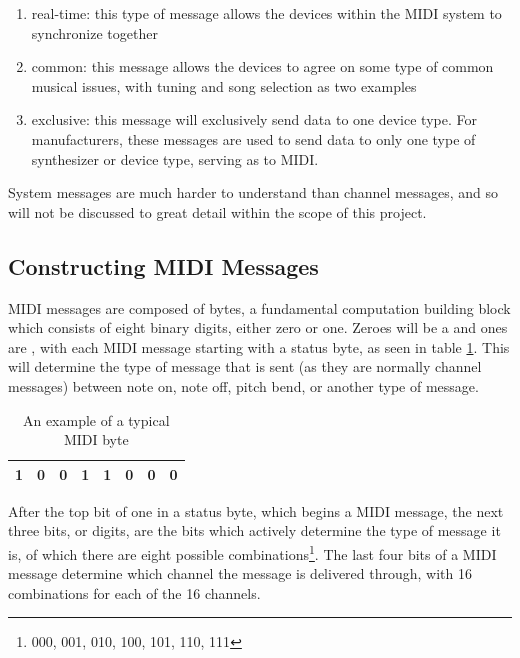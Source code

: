 \begin{enumerate}
	\item real-time: this type of message allows the devices within the MIDI system to synchronize together
	\item common: this message allows the devices to agree on some type of common musical issues, with tuning and song selection as two examples
	\item exclusive: this message will exclusively send data to one device type. For manufacturers, these messages are used to send data to only one type of synthesizer or device type, serving as  to MIDI.
\end{enumerate}\label{enu:midi-system-messages}

System messages are much harder to understand than channel messages, and so will not be discussed to great detail within the scope of this project.

\subsection[Constructing MIDI Messages]{Constructing MIDI Messages}\label{section:midi-messages}

MIDI messages are composed of bytes, a fundamental computation building block which consists of eight binary digits, either zero or one. Zeroes will be a  and ones are , with each MIDI message starting with a status byte, as seen in table \ref{tbl:typical-midi-byte}. This will determine the type of message that is sent (as they are normally channel messages) between note on, note off, pitch bend, or another type of message.

\begin{table}
	\centering
	\begin{tabular}{|c|c|c|c|c|c|c|c|}
	\hline
		1 & 0 & 0 & 1 & 1 & 0 & 0 & 0 \\
	\hline
	\end{tabular}
	\caption{An example of a typical MIDI byte}
	\label{tbl:typical-midi-byte}
\end{table}

After the top bit of one in a status byte, which begins a MIDI message, the next three bits, or digits, are the bits which actively determine the type of message it is, of which there are eight possible combinations\footnote{000, 001, 010, 100, 101, 110, 111}. The last four bits of a MIDI message determine which channel the message is delivered through, with 16 combinations for each of the 16 channels.

